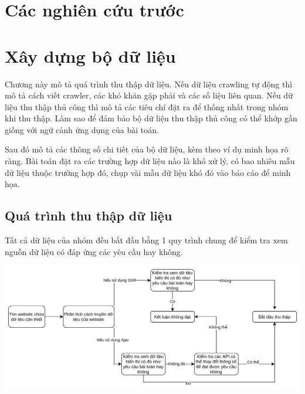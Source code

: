 \documentclass{article}
\begin{document}
\section{Các nghiên cứu trước}



\section{Xây dựng bộ dữ liệu}

\qquad Chương này mô tả quá trình thu thập dữ liệu. Nếu dữ liệu crawling tự động thì mô tả cách viết crawler, các khó khăn gặp phải và các số liệu liên quan. Nếu dữ liệu thu thập thủ công thì mô tả các tiêu chí đặt ra để thống nhất trong nhóm khi thu thập. Làm sao để đảm bảo bộ dữ liệu thu thập thủ công có thể khớp gần giống với ngữ cảnh ứng dụng của bài toán.

Sau đó mô tả các thông số chi tiết của bộ dữ liệu, kèm theo ví dụ minh họa rõ ràng. Bài toán đặt ra các trường hợp dữ liệu nào là khó xử lý, có bao nhiêu mẫu dữ liệu thuộc trường hợp đó, chụp vài mẫu dữ liệu khó đó vào báo cáo để minh họa.

\subsection{Quá trình thu thập dữ liệu}

Tất cả dữ liệu của nhóm đều bắt đầu bằng 1 quy trình chung để kiểm tra xem nguồn dữ liệu có đáp ứng các yêu cầu hay không.

\includegraphics[width=6in]{images/process.png}
\end{document}
